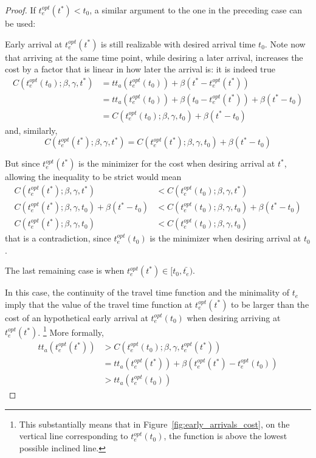 \begin{proof}
  If \(t_e^{opt}(t^*) < t_0\), a similar argument to the one in the preceding case can be used:
  
  Early arrival at \(t_e^{opt}(t^*)\) is still realizable with desired arrival time \(t_0\).
  Note now that arriving at the same time point,
  while desiring a later arrival, increases the cost by a factor that is linear in how later the arrival is:
  it is indeed true
  \begin{equation}
    \label{eq:shifting_desired}
    \begin{split}
      C(t_e^{opt}(t_0); \beta, \gamma, t^*) & = tt_a(t_e^{opt}(t_0)) + \beta(t^* - t_e^{opt}(t^*)) \\
                                            & = tt_a(t_e^{opt}(t_0)) + \beta(t_0 - t_e^{opt}(t^*)) + \beta(t^* - t_0) \\
                                            & = C(t_e^{opt}(t_0); \beta, \gamma, t_0) + \beta(t^* - t_0)
    \end{split}
  \end{equation}
  and, similarly,
  \begin{equation*}
    C(t_e^{opt}(t^*); \beta, \gamma, t^*) = C(t_e^{opt}(t^*); \beta, \gamma, t_0) + \beta(t^* - t_0)
  \end{equation*}

  But since \(t_e^{opt}(t^*)\) is the minimizer for the cost when desiring arrival at \(t^*\),
  allowing the inequality to be strict would mean
  \begin{align*}
    C(t_e^{opt}(t^*); \beta, \gamma, t^*) & < C(t_e^{opt}(t_0); \beta, \gamma, t^*) \\
    C(t_e^{opt}(t^*); \beta, \gamma, t_0) + \beta(t^* - t_0) & < C(t_e^{opt}(t_0); \beta, \gamma, t_0) + \beta(t^* - t_0) \\
    C(t_e^{opt}(t^*); \beta, \gamma, t_0) & < C(t_e^{opt}(t_0); \beta, \gamma, t_0)
  \end{align*}
  that is a contradiction, since \(t_e^{opt}(t_0)\) is the minimizer when desiring arrival at \(t_0\).

  The last remaining case is when \(t_e^{opt}(t^*) \in [t_0, \bar{t_e})\).
  
  In this case, the continuity of the travel time function and the minimality of \(t_e\) imply that the value of the travel time function at \(t_e^{opt}(t^*)\) to be larger than the cost of an hypothetical early arrival at \(t_e^{opt}(t_0)\) when desiring arriving at \(t_e^{opt}(t^*)\).
  \footnote{This substantially means that in Figure~\ref{fig:early_arrivals_cost}, on the vertical line corresponding to \(t_e^{opt}(t_0)\), the function is above the lowest possible inclined line.}
  More formally,
  \begin{align*}
    tt_a(t_e^{opt}(t^*)) & > C(t_e^{opt}(t_0); \beta, \gamma, t_e^{opt}(t^*)) \\
    & = tt_a(t_e^{opt}(t^*)) + \beta(t_e^{opt}(t^*) - t_e^{opt}(t_0)) \\
    & > tt_a(t_e^{opt}(t_0))
  \end{align*}


\end{proof}
